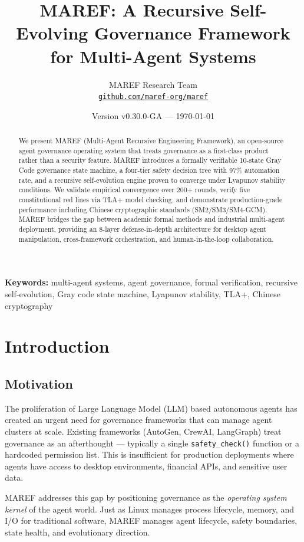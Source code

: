 \documentclass[11pt,a4paper]{article}
\title{\textbf{MAREF}: A Recursive Self-Evolving Governance Framework for Multi-Agent Systems}
\author{MAREF Research Team\\[4pt]
  \texttt{\href{https://github.com/maref-org/maref}{github.com/maref-org/maref}}}
\date{Version v0.30.0-GA --- \today}
\begin{document}
\maketitle

\begin{abstract}
We present MAREF (Multi-Agent Recursive Engineering Framework), an open-source agent governance operating system that treats governance as a first-class product rather than a security feature. MAREF introduces a formally verifiable 10-state Gray Code governance state machine, a four-tier safety decision tree with 97\% automation rate, and a recursive self-evolution engine proven to converge under Lyapunov stability conditions. We validate empirical convergence over 200+ rounds, verify five constitutional red lines via TLA+ model checking, and demonstrate production-grade performance including Chinese cryptographic standards (SM2/SM3/SM4-GCM). MAREF bridges the gap between academic formal methods and industrial multi-agent deployment, providing an 8-layer defense-in-depth architecture for desktop agent manipulation, cross-framework orchestration, and human-in-the-loop collaboration.
\end{abstract}

\noindent\textbf{Keywords:} multi-agent systems, agent governance, formal verification, recursive self-evolution, Gray code state machine, Lyapunov stability, TLA+, Chinese cryptography

\section{Introduction}

\subsection{Motivation}

The proliferation of Large Language Model (LLM) based autonomous agents has created an urgent need for governance frameworks that can manage agent clusters at scale. Existing frameworks (AutoGen, CrewAI, LangGraph) treat governance as an afterthought --- typically a single \texttt{safety\_check()} function or a hardcoded permission list. This is insufficient for production deployments where agents have access to desktop environments, financial APIs, and sensitive user data.

MAREF addresses this gap by positioning governance as the \emph{operating system kernel} of the agent world. Just as Linux manages process lifecycle, memory, and I/O for traditional software, MAREF manages agent lifecycle, safety boundaries, state health, and evolutionary direction.
\end{document}
